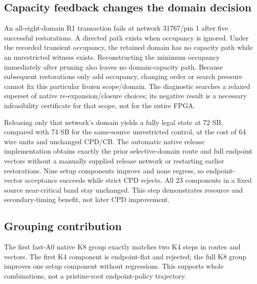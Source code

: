 \documentclass[conference,10pt]{IEEEtran}
\begin{document}
\subsection{Capacity feedback changes the domain decision}
An all-eight-domain R1 transaction fails at network 31767/pin 1 after five successful restorations. A directed path exists when occupancy is ignored. Under the recorded transient occupancy, the retained domain has no capacity path while an unrestricted witness exists. Reconstructing the minimum occupancy immediately after pruning also leaves no domain-capacity path. Because subsequent restorations only add occupancy, changing order or search pressure cannot fix this particular frozen scope/domain. The diagnostic searches a relaxed superset of native re-expansion/closure choices; its negative result is a necessary infeasibility certificate for that scope, not for the entire FPGA.

Releasing only that network's domain yields a fully legal state at 72 SB, compared with 74 SB for the same-source unrestricted control, at the cost of 64 wire units and unchanged CPD/CB. The automatic native release implementation obtains exactly the prior selective-domain route and full endpoint vectors without a manually supplied release network or restarting earlier restorations. Nine setup components improve and none regress, so endpoint-vector acceptance succeeds while strict CPD rejects. All 23 components in a fixed source near-critical band stay unchanged. This step demonstrates resource and secondary-timing benefit, not later CPD improvement.

\subsection{Grouping contribution}
The first fast-A0 native K8 group exactly matches two K4 steps in routes and vectors. The first K4 component is endpoint-flat and rejected; the full K8 group improves one setup component without regressions. This supports whole combinations, not a pristine-root endpoint-policy trajectory.
\end{document}
